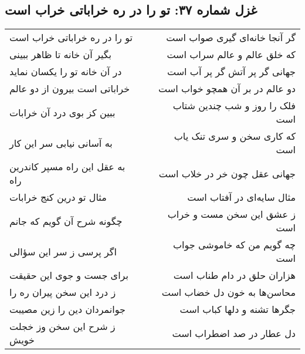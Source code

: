 \begin{center}
\section*{غزل شماره ۳۷: تو را در ره خراباتی خراب است}
\label{sec:037}
\begin{longtable}{l p{0.5cm} r}
تو را در ره خراباتی خراب است
&&
گر آنجا خانه‌ای گیری صواب است
\\
بگیر آن خانه تا ظاهر ببینی
&&
که خلق عالم و عالم سراب است
\\
در آن خانه تو را یکسان نماید
&&
جهانی گر پر آتش گر پر آب است
\\
خراباتی است بیرون از دو عالم
&&
دو عالم در بر آن همچو خواب است
\\
ببین کز بوی درد آن خرابات
&&
فلک را روز و شب چندین شتاب است
\\
به آسانی نیابی سر این کار
&&
که کاری سخن و سری تنک یاب است
\\
به عقل این راه مسپر کاندرین راه
&&
جهانی عقل چون خر در خلاب است
\\
مثال تو درین کنج خرابات
&&
مثال سایه‌ای در آفتاب است
\\
چگونه شرح آن گویم که جانم
&&
ز عشق این سخن مست و خراب است
\\
اگر پرسی ز سر این سؤالی
&&
چه گویم من که خاموشی جواب است
\\
برای جست و جوی این حقیقت
&&
هزاران حلق در دام طناب است
\\
ز درد این سخن پیران ره را
&&
محاسن‌ها به خون دل خضاب است
\\
جوانمردان دین را زین مصیبت
&&
جگرها تشنه و دلها کباب است
\\
ز شرح این سخن وز خجلت خویش
&&
دل عطار در صد اضطراب است
\\
\end{longtable}
\end{center}

